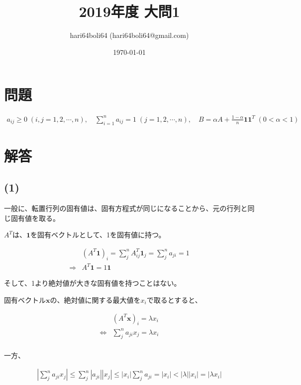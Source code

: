 \documentclass[a4paper, 10pt, dvipdfmx]{jlreq}
\begin{document}
\title{2019年度 大問1}
\author{hari64boli64 (hari64boli64@gmail.com)}
\date{\today}
\maketitle


\section{問題}

\begin{align*}
    a_{ij} \geq 0 \; (i,j = 1,2,\cdots,n), \quad \sum_{i=1}^{n}a_{ij}=1 \; (j=1,2,\cdots,n),  \quad B=\alpha A+\frac{1-\alpha}{n}\bm{1}\bm{1}^T \; (0<\alpha<1)
\end{align*}

\section{解答}

\subsection*{(1)}

一般に、転置行列の固有値は、固有方程式が同じになることから、元の行列と同じ固有値を取る。

$A^T$は、$\bm{1}$を固有ベクトルとして、1を固有値に持つ。

\begin{align*}
                & (A^T\bm{1})_i=\sum_{j}^n A^T_{ij}\bm{1}_j=\sum_{j}^na_{ji}=1 \\
    \Rightarrow & A^T\bm{1}=1\bm{1}
\end{align*}

そして、1より絶対値が大きな固有値を持つことはない。

固有ベクトル$\bm{x}$の、絶対値に関する最大値を$x_i$で取るとすると、

\begin{align*}
                    & (A^T\bm{x})_i =\lambda x_i        \\
    \Leftrightarrow & \sum_{j}^n a_{ji}x_j =\lambda x_i \\
\end{align*}

一方、

\begin{align*}
    \left|\sum_{j}^n a_{ji}x_j\right|\leq \sum_{j}^n |a_{ji}||x_j| \leq |x_i|\sum_{j}^n a_{ji} = |x_i| < |\lambda||x_i|=|\lambda x_i|
\end{align*}
\end{document}
